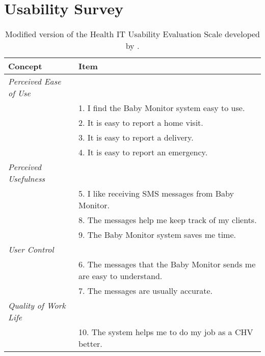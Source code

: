 \chapter{Usability Survey }


\begin{table}[htbp]
  \centering
  \caption{Modified version of the Health IT Usability Evaluation Scale developed by \cite{Yen2010}.}
    \begin{tabular}{ll}
    \toprule
    \textbf{Concept} & \textbf{Item} \\
    \midrule
    \textit{Perceived Ease of Use} &  \\
    \textit{} & 1. I find the Baby Monitor system easy to use.  \\
    \textit{} & 2. It is easy to report a home visit. \\
    \textit{} & 3. It is easy to report a delivery.  \\
    \textit{} & 4. It is easy to report an emergency.  \\
    \textit{Perceived Usefulness} &  \\
    \textit{} & 5. I like receiving SMS messages from Baby Monitor.  \\
    \textit{} & 8. The messages help me keep track of my clients.  \\
    \textit{} & 9. The Baby Monitor system saves me time.  \\
    \textit{User Control} &  \\
    \textit{} & 6. The messages that the Baby Monitor sends me are easy to understand.  \\
    \textit{} & 7. The messages are usually accurate.  \\
    \textit{Quality of Work Life} & \textbf{} \\
          & 10. The system helps me to do my job as a CHV better.  \\
    \bottomrule
    \end{tabular}%
  \label{tab:usesurvey}%
\end{table}%


